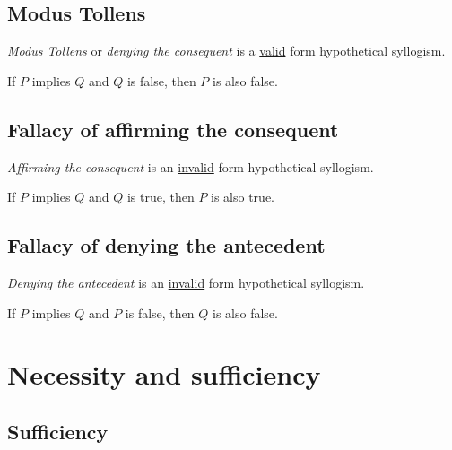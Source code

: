\documentclass{article}
\begin{document}
\subsection{Modus Tollens}

\textit{Modus Tollens} or \textit{denying the consequent}
is a \underline{valid} form hypothetical syllogism.

\begin{prooftree}
\end{prooftree}

If \(P\) implies \(Q\) and \(Q\) is false, then \(P\) is also false.

\subsection{Fallacy of affirming the consequent}

\textit{Affirming the consequent}
is an \underline{invalid} form hypothetical syllogism.

\begin{prooftree}
\end{prooftree}

If \(P\) implies \(Q\) and \(Q\) is true, then \(P\) is also true.

\subsection{Fallacy of denying the antecedent}

\textit{Denying the antecedent}
is an \underline{invalid} form hypothetical syllogism.

\begin{prooftree}
\end{prooftree}

If \(P\) implies \(Q\) and \(P\) is false, then \(Q\) is also false.

\pagebreak

\section{Necessity and sufficiency}

\subsection{Sufficiency}
\end{document}
